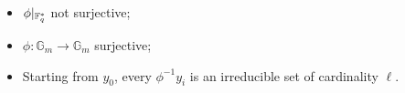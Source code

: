 \documentclass[12pt]{beamer}
\begin{document}
\begin{frame}
\begin{columns}
\begin{column}{0.6\textwidth}
\begin{center}
      \end{center}
    \end{column}
    \begin{column}{0.4\textwidth}
      \begin{itemize}
      \item<3-> $\phi|_{\mathbb{F}_q^\ast}$ not surjective;
      \item<4-> $\phi : \mathbb{G}_m \to \mathbb{G}_m$ surjective;
      \item<5-> Starting from $y_0$, every $\phi^{-1}y_i$ is an
        irreducible set of cardinality $\ell$.
      \end{itemize}
    \end{column}
  \end{columns}
\end{frame}

\end{document}
